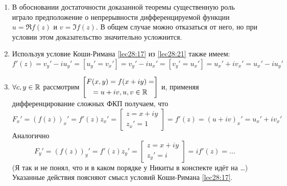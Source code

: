 \documentclass[../../main.tex]{subfiles}
\begin{document}
	
\begin{rems}

\;

\begin{enumerate}
	\item В обосновании достаточности доказанной теоремы существенную роль 
	играло предположение о непрерывности дифференцируемой функции 
	$ u = \Re f(z) $ и $ v = \Im f(z) $. В общем случае  можно отказаться 
	от него, но при условии этом доказательство значительно усложнится.
	\item Используя условие Коши-Римана \eqref{lec28:17} из \eqref{lec28:21} 
	также имеем:
	\begin{equation}
	\label{lec29:22} 
	f'(z) = v_y' - iu_y' = \left[u_y' = v_x'\right] =
	v_y' - iu_x' = \left[v_y' = u_x'\right] = u_x' + iv_x' = u_x' - iu_y'
	\end{equation}
	\item $ \forall c, y \in \mathbb{R} $ рассмотрим 
	$ \left[\begin{gathered}
		F(x, y) = f(x + iy) =\\
		=u + iv, u, v \in \mathbb{R}
	\end{gathered}\right] $ 
	и, применяя дифференцирование сложных ФКП получаем, что 
	\[ 
	F_x' = (f(z))_x' = f'(z)z_x' = \left[
	\begin{gathered}
		z = x + iy\\
		z_x' = 1
	\end{gathered}
	\right] = f'(z) = (u + iv)_x' = u_x' + iv_x'
	\]
	Аналогично
	\[ 
	F_y' = (f(z))_y' = f'(z)z_y' = \left[
	\begin{gathered}
	z = x + iy\\
	z_y' = i
	\end{gathered}
	\right] = if'(z) = \dots
	\]
	(Я так и не понял, что и в каком порядке у Никиты в конспекте идёт на \dots)
	Указанные действия поясняют смысл условий Коши-Римана \eqref{lec28:17}.
\end{enumerate}
\end{rems}
\end{document}
